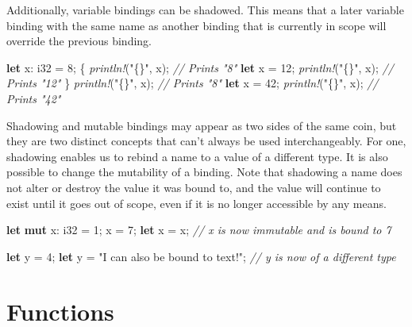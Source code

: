 \documentclass[a4paper,]{book}
\renewcommand*{\hypertarget}[3][\ar]{%
  \def\ar{#2}%
  \label{#1}%
  #3}
\newenvironment{Shaded}{\begin{snugshade}}{\end{snugshade}}
\newcommand{\KeywordTok}[1]{\textcolor[rgb]{0.13,0.29,0.53}{\textbf{{#1}}}}
\newcommand{\DataTypeTok}[1]{\textcolor[rgb]{0.13,0.29,0.53}{{#1}}}
\newcommand{\DecValTok}[1]{\textcolor[rgb]{0.00,0.00,0.81}{{#1}}}
\newcommand{\StringTok}[1]{\textcolor[rgb]{0.31,0.60,0.02}{{#1}}}
\newcommand{\CommentTok}[1]{\textcolor[rgb]{0.56,0.35,0.01}{\textit{{#1}}}}
\newcommand{\PreprocessorTok}[1]{\textcolor[rgb]{0.56,0.35,0.01}{\textit{{#1}}}}
\newcommand{\NormalTok}[1]{{#1}}
\begin{document}
Additionally, variable bindings can be shadowed. This means that a later
variable binding with the same name as another binding that is currently
in scope will override the previous binding.

\begin{Shaded}
\begin{Highlighting}[]
\KeywordTok{let} \NormalTok{x: }\DataTypeTok{i32} \NormalTok{= }\DecValTok{8}\NormalTok{;}
\NormalTok{\{}
    \PreprocessorTok{println!}\NormalTok{(}\StringTok{"\{\}"}\NormalTok{, x); }\CommentTok{// Prints "8"}
    \KeywordTok{let} \NormalTok{x = }\DecValTok{12}\NormalTok{;}
    \PreprocessorTok{println!}\NormalTok{(}\StringTok{"\{\}"}\NormalTok{, x); }\CommentTok{// Prints "12"}
\NormalTok{\}}
\PreprocessorTok{println!}\NormalTok{(}\StringTok{"\{\}"}\NormalTok{, x); }\CommentTok{// Prints "8"}
\KeywordTok{let} \NormalTok{x =  }\DecValTok{42}\NormalTok{;}
\PreprocessorTok{println!}\NormalTok{(}\StringTok{"\{\}"}\NormalTok{, x); }\CommentTok{// Prints "42"}
\end{Highlighting}
\end{Shaded}

Shadowing and mutable bindings may appear as two sides of the same coin,
but they are two distinct concepts that can't always be used
interchangeably. For one, shadowing enables us to rebind a name to a
value of a different type. It is also possible to change the mutability
of a binding. Note that shadowing a name does not alter or destroy the
value it was bound to, and the value will continue to exist until it
goes out of scope, even if it is no longer accessible by any means.

\begin{Shaded}
\begin{Highlighting}[]
\KeywordTok{let} \KeywordTok{mut} \NormalTok{x: }\DataTypeTok{i32} \NormalTok{= }\DecValTok{1}\NormalTok{;}
\NormalTok{x = }\DecValTok{7}\NormalTok{;}
\KeywordTok{let} \NormalTok{x = x; }\CommentTok{// x is now immutable and is bound to 7}

\KeywordTok{let} \NormalTok{y = }\DecValTok{4}\NormalTok{;}
\KeywordTok{let} \NormalTok{y = }\StringTok{"I can also be bound to text!"}\NormalTok{; }\CommentTok{// y is now of a different type}
\end{Highlighting}
\end{Shaded}

\hypertarget{sec--functions}{\section{Functions}\label{sec--functions}}
\end{document}
